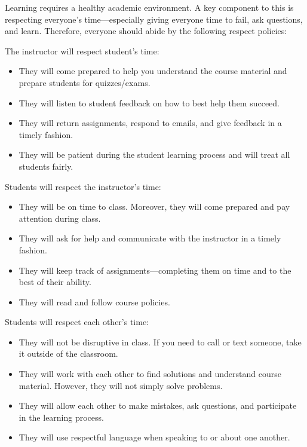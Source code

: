 \documentclass[11pt,letterpaper]{article}
\begin{document}
Learning requires a healthy academic environment. A key component to this is respecting everyone's time---especially giving everyone time to fail, ask questions, and learn. Therefore, everyone should abide by the following respect policies: 

The instructor will respect student's time:
	\begin{itemize}
	\item They will come prepared to help you understand the course material and prepare students for quizzes/exams. 
	\item They will listen to student feedback on how to best help them succeed. 
	\item They will return assignments, respond to emails, and give feedback in a timely fashion. 
	\item They will be patient during the student learning process and will treat all students fairly. 
	\end{itemize} \pspace

Students will respect the instructor's time:
	\begin{itemize}
	\item They will be on time to class. Moreover, they will come prepared and pay attention during class. 
	\item They will ask for help and communicate with the instructor in a timely fashion. 
	\item They will keep track of assignments---completing them on time and to the best of their ability.  
	\item They will read and follow course policies. 
	\end{itemize} \pspace





\newpage





Students will respect each other's time:
	\begin{itemize}
	\item They will not be disruptive in class. If you need to call or text someone, take it outside of the classroom. 
	\item They will work with each other to find solutions and understand course material. However, they will not simply solve problems. 
	\item They will allow each other to make mistakes, ask questions, and participate in the learning process. 
	\item They will use respectful language when speaking to or about one another. 
	\end{itemize}
\sectionbreak
\end{document}
